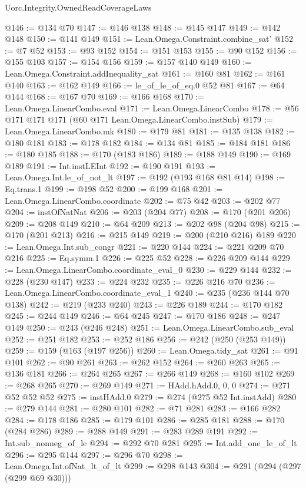 \begin{lexlean}{Uorc.Integrity.OwnedReadCoverageLaws}
\begin{coremodule}
@146 := @134 @70
@147 := @146 @138
@148 := @145 @147
@149 := @142 @148
@150 := @141 @149
@151 := Lean.Omega.Constraint.combine_sat'
@152 := @7 @52
@153 := @93 @152
@154 := @151 @153
@155 := @90 @152
@156 := @155 @103
@157 := @154 @156
@159 := @157 @140 @149
@160 := Lean.Omega.Constraint.addInequality_sat
@161 := @160 @81
@162 := @161 @140
@163 := @162 @149
@166 := le_of_le_of_eq.{0} @52 @81
@167 := @64 @144
@168 := @167 @70
@169 := @166 @168
@170 := Lean.Omega.LinearCombo.eval
@171 := Lean.Omega.LinearCombo
@178 := @56 @171 @171 @171 (@60 @171 Lean.Omega.LinearCombo.instSub)
@179 := Lean.Omega.LinearCombo.mk
@180 := @179 @81
@181 := @135 @138
@182 := @180 @181
@183 := @178 @182
@184 := @134 @81
@185 := @184 @181
@186 := @180 @185
@188 := @170 (@183 @186)
@189 := @188 @149
@190 := @169 @189
@191 := Int.instLEInt
@192 := @190 @191
@193 := Lean.Omega.Int.le_of_not_lt
@197 := @192 (@193 @168 @81 @14)
@198 := Eq.trans.{1}
@199 := @198 @52
@200 := @199 @168
@201 := Lean.Omega.LinearCombo.coordinate
@202 := @75 @42
@203 := @202 @77
@204 := instOfNatNat
@206 := @203 (@204 @77)
@208 := @170 (@201 @206)
@209 := @208 @149
@210 := @64 @209
@213 := @202 @98 (@204 @98)
@215 := @170 (@201 @213)
@216 := @215 @149
@219 := @200 (@210 @216) @189
@220 := Lean.Omega.Int.sub_congr
@221 := @220 @144
@224 := @221 @209 @70 @216
@225 := Eq.symm.{1}
@226 := @225 @52
@228 := @226 @209 @144
@229 := Lean.Omega.LinearCombo.coordinate_eval_0
@230 := @229 @144
@232 := @228 (@230 @147)
@233 := @224 @232
@235 := @226 @216 @70
@236 := Lean.Omega.LinearCombo.coordinate_eval_1
@240 := @235 (@236 @144 @70 @138)
@242 := @219 (@233 @240)
@243 := @226 @189
@244 := @170 @182
@245 := @244 @149
@246 := @64 @245
@247 := @170 @186
@248 := @247 @149
@250 := @243 (@246 @248)
@251 := Lean.Omega.LinearCombo.sub_eval
@252 := @251 @182
@253 := @252 @186
@256 := @242 (@250 (@253 @149))
@259 := @159 (@163 (@197 @256))
@260 := Lean.Omega.tidy_sat
@261 := @91 @101
@262 := @90 @261
@263 := @262 @152
@264 := @260 @263
@265 := @136 @181
@266 := @264 @265
@267 := @266 @149
@268 := @160 @102
@269 := @268 @265
@270 := @269 @149
@271 := HAdd.hAdd.{0, 0, 0}
@274 := @271 @52 @52 @52
@275 := instHAdd.{0}
@279 := @274 (@275 @52 Int.instAdd)
@280 := @279 @144
@281 := @280 @101
@282 := @71 @281
@283 := @166 @282
@284 := @178 @186
@285 := @179 @101
@286 := @285 @181
@288 := @170 (@284 @286)
@289 := @288 @149
@291 := @283 @289 @191
@292 := Int.sub_nonneg_of_le
@294 := @292 @70 @281
@295 := Int.add_one_le_of_lt
@296 := @295 @144
@297 := @296 @70
@298 := Lean.Omega.Int.ofNat_lt_of_lt
@299 := @298 @143
@304 := @291 (@294 (@297 (@299 @69 @30)))

\end{coremodule}
\end{lexlean}
